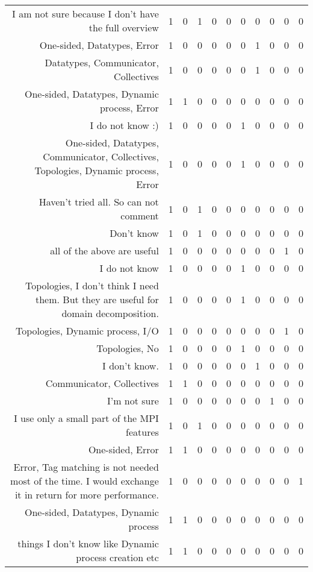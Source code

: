 {\begin{landscape}
\begin{longtable}[htb]{r|c|c|c|c|c|c|c|c|c|c}
{I am not sure because I don't have the full overview} & 1 & 0 & 1 & 0 & 0 & 0 & 0 & 0 & 0 & 0 \\%
{One-sided, Datatypes, Error} & 1 & 0 & 0 & 0 & 0 & 0 & 1 & 0 & 0 & 0 \\%
{Datatypes, Communicator, Collectives} & 1 & 0 & 0 & 0 & 0 & 0 & 1 & 0 & 0 & 0 \\%
{One-sided, Datatypes, Dynamic process, Error} & 1 & 1 & 0 & 0 & 0 & 0 & 0 & 0 & 0 & 0 \\%
{I do not know :)} & 1 & 0 & 0 & 0 & 0 & 1 & 0 & 0 & 0 & 0 \\%
{One-sided, Datatypes, Communicator, Collectives, Topologies, Dynamic process, Error} & 1 & 0 & 0 & 0 & 0 & 1 & 0 & 0 & 0 & 0 \\%
{Haven't tried all. So can not comment} & 1 & 0 & 1 & 0 & 0 & 0 & 0 & 0 & 0 & 0 \\%
{Don't know} & 1 & 0 & 1 & 0 & 0 & 0 & 0 & 0 & 0 & 0 \\%
{all of the above are useful} & 1 & 0 & 0 & 0 & 0 & 0 & 0 & 0 & 1 & 0 \\%
{I do not know} & 1 & 0 & 0 & 0 & 0 & 1 & 0 & 0 & 0 & 0 \\%
{Topologies, I don't think I need them. But they are useful for domain decomposition.} & 1 & 0 & 0 & 0 & 0 & 1 & 0 & 0 & 0 & 0 \\%
{Topologies, Dynamic process, I/O} & 1 & 0 & 0 & 0 & 0 & 0 & 0 & 0 & 1 & 0 \\%
{Topologies, No} & 1 & 0 & 0 & 0 & 0 & 1 & 0 & 0 & 0 & 0 \\%
{I don't know.} & 1 & 0 & 0 & 0 & 0 & 0 & 1 & 0 & 0 & 0 \\%
{Communicator, Collectives} & 1 & 1 & 0 & 0 & 0 & 0 & 0 & 0 & 0 & 0 \\%
{I'm not sure} & 1 & 0 & 0 & 0 & 0 & 0 & 0 & 1 & 0 & 0 \\%
{I use only a small part of the MPI features} & 1 & 0 & 1 & 0 & 0 & 0 & 0 & 0 & 0 & 0 \\%
{One-sided, Error} & 1 & 1 & 0 & 0 & 0 & 0 & 0 & 0 & 0 & 0 \\%
{Error, Tag matching is not needed most of the time. I would exchange it in return for more performance.} & 1 & 0 & 0 & 0 & 0 & 0 & 0 & 0 & 0 & 1 \\%
{One-sided, Datatypes, Dynamic process} & 1 & 1 & 0 & 0 & 0 & 0 & 0 & 0 & 0 & 0 \\%
{things I don't know like Dynamic process creation etc} & 1 & 1 & 0 & 0 & 0 & 0 & 0 & 0 & 0 & 0 \\%

\end{longtable}
\end{landscape}}
